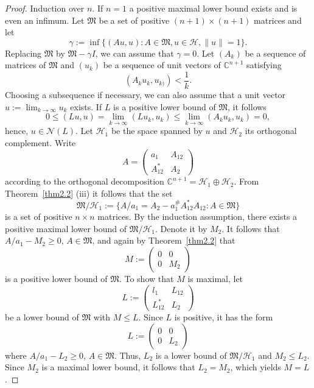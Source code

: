\documentclass[12pt, a4paper, reqno, twoside]{amsart}
\numberwithin{equation}{section}
\newcommand{\frakM}{\mathfrak M}
\theoremstyle{definition}
\theoremstyle{remark}
\theoremstyle{mystyle}
\begin{document}
\begin{proof}
Induction over $n$. If $n=1$ a positive maximal lower bound exists and
is even an infimum. Let $\frakM$ be a set of positive
$(n+1)\times(n+1)$ matrices and let
\[
\gamma:=\inf\bigl\{(Au,u):A\in\frakM,u\in\mathscr H,\|u\|=1\bigr\}.
\]
Replacing $\frakM$ by $\frakM-\gamma I$, we can assume that $\gamma=0$.
Let $(A_{k})$ be a sequence of matrices of $\frakM$ and $(u_{k})$ be a
sequence of unit vectors of $\mathbb C^{n+1}$ satisfying
\[
  (A_{k}u_{k},u_{k)}) < \frac{1}{k}.
\]
Choosing a subsequence if necessary, we can also assume that a unit
vector  $u:=\lim_{k\to\infty}u_{k}$ exists. If $L$ is a positive lower
bound of  $\frakM$, it follows
\[
  0\leq(Lu,u)=\lim_{k\to\infty}(Lu_{k},u_{k})
  \leq\lim_{k\to\infty}(A_{k}u_{k},u_{k})=0,
\]
hence, $u\in\mathscr N(L)$. Let $\mathscr H_{1}$ be the space spanned
by $u$ and $\mathscr H_{2}$ its orthogonal complement. Write
\[
  A=\begin{pmatrix}a_{1}&A_{12}\\A_{12}^{\ast}&A_{2}\end{pmatrix}
\]
according to the orthogonal decomposition $\mathbb C^{n+1}=\mathscr
H_{1}\oplus\mathscr H_{2}$. From Theorem~\ref{thm2.2} (iii) it follows
that the set
\[
\frakM/\mathscr H_{1}:=\bigl\{
A/a_{1}=A_{2}-a_{1}^{\#}A_{12}^{\ast}A_{12} : A\in\frakM\bigr\} 
\]
is a set of positive $n\times n$ matrices. By the induction assumption,
there exists a positive maximal lower bound of $\frakM/\mathscr
H_{1}$. Denote it by $M_{2}$. It follows that $A/a_{1}-M_{2}\geq0$,
$A\in\frakM$, and again by Theorem~\ref{thm2.2} that
\[
M:=\begin{pmatrix}0&0\\0&M_{2}\end{pmatrix}
\]
is a positive lower bound of $\frakM$. To show that $M$ is maximal, let
\[
L:=\begin{pmatrix}l_{1}&L_{12}\\L_{12}^{\ast}&L_{2}\end{pmatrix}
\]
be a lower bound of $\frakM$ with $M\leq L$. Since $L$ is positive, it
has the form
\[
L:=\begin{pmatrix}0&0\\0&L_{2}\end{pmatrix}
\]
where $A/a_{1}-L_{2}\geq0$, $A\in\frakM$. Thus, $L_{2}$ is a lower
bound of $\frakM/\mathscr H_{1}$ and $M_{2}\leq L_{2}$. Since $M_{2}$
is a maximal lower bound, it follows that $L_{2}=M_{2}$, which yields
$M=L$.  
\end{proof}  
\end{document}

